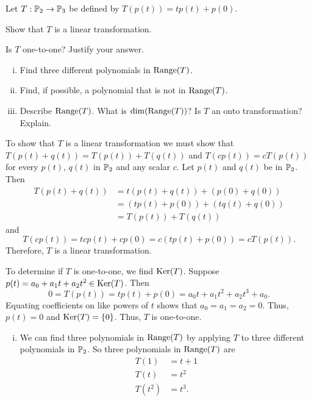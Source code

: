 \begin{example} Let $T : \mathbb{P}_2 \to \mathbb{P}_3$ be defined by $T(p(t)) = tp(t)+p(0)$.
\ba
\item Show that $T$ is a linear transformation.

\item Is $T$ one-to-one? Justify your answer. 

\item 
	\begin{enumerate}[i.]
	\item Find three different polynomials in $\text{Range}(T)$. 
	
	\item Find, if possible, a polynomial that is not in $\text{Range}(T)$. 
	
	\item Describe $\text{Range}(T)$. What is $\dim(\text{Range}(T))$? Is $T$ an onto transformation? Explain. 
	\end{enumerate}

\ea

\ExampleSolution

\ba
\item To show that $T$ is a linear transformation we must show that $T(p(t)+q(t)) = T(p(t)) + T(q(t))$ and $T(cp(t)) = cT(p(t))$ for every $p(t)$, $q(t)$ in $\mathbb{P}_2$ and any scalar $c$. Let $p(t)$ and $q(t)$ be in $\mathbb{P}_2$. Then 
\begin{align*}
T(p(t)+q(t)) &= t(p(t)+q(t)) + (p(0)+q(0)) \\
	&= \left(tp(t) + p(0)\right) + \left( tq(t) + q(0) \right) \\
	&= T(p(t)) + T(q(t))
\end{align*}
and 
\[T(cp(t)) = tcp(t) + cp(0) = c\left(tp(t)+p(0)\right) = cT(p(t)).\]
Therefore, $T$ is a linear transformation.

\item To determine if $T$ is one-to-one, we find $\text{Ker}(T)$. Suppose $p(t) = a_0+a_1t+a_2t^2  \in \text{Ker}(T)$. Then 
\[0 = T(p(t)) = tp(t) + p(0) =  a_0t+a_1t^2 +a_2t^3 + a_0. \]
Equating coefficients on like powers of $t$ shows that $a_0 = a_1 = a_2 = 0$. Thus, $p(t) = 0$ and $\text{Ker}(T) = \{0\}$. Thus, $T$ is one-to-one.

\item 
	\begin{enumerate}[i.]
	\item We can find three polynomials in $\text{Range}(T)$ by applying $T$ to three different polynomials in $\mathbb{P}_2$. So three polynomials in $\text{Range}(T)$ are
	\begin{align*}
	T(1) &= t+1  \\
	T(t) &= t^2 \\
	T\left(t^2\right) &= t^3.
	\end{align*}
	

\end{enumerate}
\end{example}
